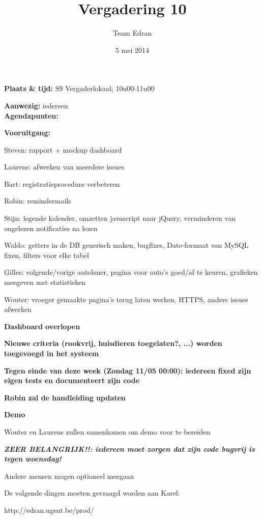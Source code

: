 \documentclass[11pt,a4paper,oneside]{article}
\title{Vergadering 10}
\author{Team Edran}
\date{5 mei 2014}
\renewenvironment{itemize}[1]{\begin{compactitem}#1}{\end{compactitem}}
\begin{document}
\maketitle

\textbf{Plaats \& tijd:}
S9 Vergaderlokaal; 10u00-11u00\par
\textbf{Aanwezig:} iedereen \\
\textbf{Agendapunten:}
\begin{itemize}
\item \textbf{Vooruitgang:}\\
\begin{itemize}
\item Steven: rapport + mockup dashboard
\item Laurens: afwerken van meerdere issues
\item Bart: registratieprocedure verbeteren
\item Robin: remindermails
\item Stijn: legende kalender, omzetten javascript naar jQuery, verminderen van ongelezen notificaties na lezen
\item Waldo: getters in de DB generisch maken, bugfixes, Date-formaat van MySQL fixen, filters voor elke tabel
\item Gilles: volgende/vorige autolener, pagina voor auto's goed/af te keuren, grafieken meegeven met statistieken
\item Wouter: vroeger gemaakte pagina's terug laten werken, HTTPS, andere issues afwerken
\end{itemize}

\item \textbf{Dashboard overlopen}

\item \textbf{Nieuwe criteria (rookvrij, huisdieren toegelaten?, ...) worden toegevoegd in het systeem}

\item \textbf{Tegen einde van deze week (Zondag 11/05 00:00): iedereen fixed zijn eigen tests en documenteert zijn code}

\item \textbf{Robin zal de handleiding updaten}

\item \textbf{Demo}
  \begin{itemize}
   \item Wouter en Laurens zullen samenkomen om demo voor te bereiden
   \item \textbf{\emph{ZEER BELANGRIJK!!: iedereen moet zorgen dat zijn code bugvrij is tegen woensdag!}}
   \item Andere mensen mogen optioneel meegaan
   \item De volgende dingen moeten gevraagd worden aan Karel:
      \begin{itemize}
      	\item  http://edran.ugent.be/prod/ 


\end{itemize}
\end{itemize}
\end{itemize}
\end{document}
